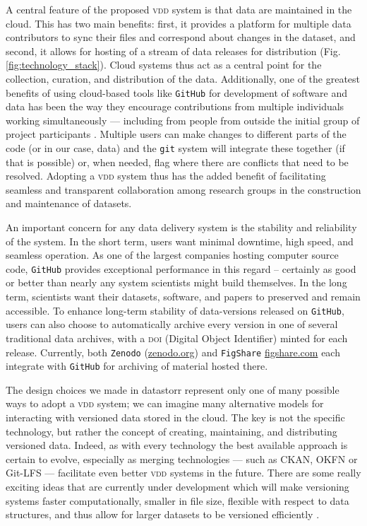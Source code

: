 \documentclass[a4paper,11pt]{article}
\newcommand{\smurl}[1]{{\footnotesize\href{https://#1}{#1}}}
\begin{document}
A central feature of the proposed  \textsc{vdd} system is that data are maintained in the cloud. This has two main benefits: first, it provides a platform for multiple data contributors to sync their files and correspond about changes in the dataset, and second, it allows for hosting of a stream of data releases for distribution (Fig. \ref{fig:technology_stack}). Cloud systems thus act as a central point for the collection, curation, and distribution of the data. Additionally, one of the greatest benefits of using cloud-based tools like  \texttt{GitHub} for development of software and data has been the way they encourage contributions from multiple individuals working simultaneously --- including from people from outside the initial group of project participants \citep{Rogers-2013, Perkel-2016}. Multiple users can make changes to different parts of the code (or in our case, data) and the \texttt{git} system will integrate these together (if that is possible) or, when needed, flag where there are conflicts that need to be resolved. Adopting a \textsc{vdd} system thus has the added benefit of facilitating seamless and transparent collaboration among research groups in the construction and maintenance of datasets.

An important concern for any data delivery system is the stability and reliability of the system. In the short term, users want minimal downtime, high speed, and seamless operation. As one of the largest companies hosting computer source code, \texttt{GitHub} provides exceptional performance in this regard -- certainly as good or better than nearly any system scientists might build themselves. In the long term, scientists want their datasets, software, and papers to preserved and remain accessible. To enhance long-term stability of data-versions released on \texttt{GitHub}, users can also choose to automatically archive every version in one of several traditional data archives, with a \textsc{doi} (Digital Object Identifier) minted for each release. Currently, both \texttt{Zenodo} (\smurl{zenodo.org}) and  \texttt{FigShare} \smurl{figshare.com} each integrate with \texttt{GitHub} for archiving of material hosted there.

The design choices we made in datastorr represent only one of many possible ways to adopt a \textsc{vdd} system; we can imagine many alternative models for interacting with versioned data stored in the cloud. The key is not the specific technology, but rather the concept of creating, maintaining, and distributing versioned data. Indeed, as with every technology the best available approach is certain to evolve, especially as merging technologies --- such as CKAN, OKFN or Git-LFS --- facilitate even better \textsc{vdd} systems in the future.  There are some really exciting ideas that are currently under development which will make versioning systems faster computationally, smaller in file size, flexible with respect to data structures, and thus allow for larger datasets to be versioned efficiently \citep[e.g.,][]{Fli, Dat}. 
\end{document}
